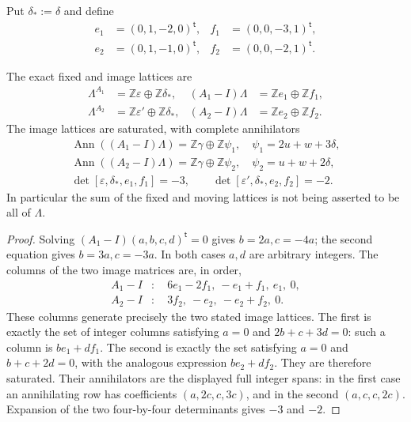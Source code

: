 Put $\delta_*:=\widehat\delta$ and define
\[
\begin{aligned}
 e_1&=(0,1,-2,0)^{\mathsf t},&f_1&=(0,0,-3,1)^{\mathsf t},\\
 e_2&=(0,1,-1,0)^{\mathsf t},&f_2&=(0,0,-2,1)^{\mathsf t}.
\end{aligned}
\tag{FF6}\label{wb:ffcert:eq:moving-generators}
\]

\begin{proposition}
\label{wb:ffcert:prop:integral-summands}
The exact fixed and image lattices are
\[
\begin{aligned}
 \Lambda^{A_1}&=\mathbb Z\varepsilon\oplus\mathbb Z\delta_*,&
 (A_1-I)\Lambda&=\mathbb Ze_1\oplus\mathbb Zf_1,\\
 \Lambda^{A_2}&=\mathbb Z\varepsilon'\oplus\mathbb Z\delta_*,&
 (A_2-I)\Lambda&=\mathbb Ze_2\oplus\mathbb Zf_2.
\end{aligned}
\tag{FF7}\label{wb:ffcert:eq:integral-summands}
\]
The image lattices are saturated, with complete annihilators
\[
\begin{gathered}
 \operatorname{Ann}((A_1-I)\Lambda)
 =\mathbb Z\gamma\oplus\mathbb Z\psi_1,
 \quad \psi_1=2u+w+3\delta,\\
 \operatorname{Ann}((A_2-I)\Lambda)
 =\mathbb Z\gamma\oplus\mathbb Z\psi_2,
 \quad \psi_2=u+w+2\delta,\\
 \det[\varepsilon,\delta_*,e_1,f_1]=-3,
 \qquad \det[\varepsilon',\delta_*,e_2,f_2]=-2.
\end{gathered}
\tag{FF8}\label{wb:ffcert:eq:annihilators-indices}
\]
In particular the sum of the fixed and moving lattices is not being
asserted to be all of $\Lambda$.
\end{proposition}

\begin{proof}
Solving $(A_1-I)(a,b,c,d)^{\mathsf t}=0$ gives $b=2a,c=-4a$;
the second equation gives $b=3a,c=-3a$. In both cases $a,d$ are arbitrary
integers. The columns of the two image matrices are, in order,
\[
 \begin{aligned}
 A_1-I &: \quad 6e_1-2f_1,\ -e_1+f_1,\ e_1,\ 0,\\
 A_2-I &: \quad 3f_2,\ -e_2,\ -e_2+f_2,\ 0.
 \end{aligned}
 \tag{FF9}\label{wb:ffcert:eq:image-columns}
\]
These columns generate precisely the two stated image lattices. The first
is exactly the set of integer columns satisfying $a=0$ and
$2b+c+3d=0$: such a column is $be_1+df_1$. The second is exactly
the set satisfying $a=0$ and $b+c+2d=0$, with the analogous expression
$be_2+df_2$. They are therefore saturated. Their annihilators are the
displayed full integer spans: in the first case an annihilating row has
coefficients $(a,2c,c,3c)$, and in the second $(a,c,c,2c)$.
Expansion of the two four-by-four determinants gives $-3$ and $-2$.
\end{proof}


